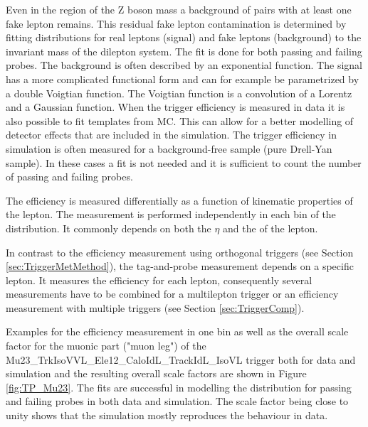 Even in the region of the Z boson mass a background of pairs with at least one fake lepton remains. This residual fake lepton contamination is determined by fitting distributions for real leptons (signal) and fake leptons (background) to the invariant mass of the dilepton system. The fit is done for both passing and failing probes. The background is often described by an exponential function. The signal has a more complicated functional form and can for example be parametrized by a double Voigtian function. The Voigtian function is a convolution of a Lorentz and a Gaussian function. When the trigger efficiency is measured in data it is also possible to fit templates from MC. This can allow for a better modelling of detector effects that are included in the simulation.
The trigger efficiency in simulation is often measured for a background-free sample (pure Drell-Yan sample). In these cases a fit is not needed and it is sufficient to count the number of passing and failing probes.

The efficiency is measured differentially as a function of kinematic properties of the lepton. The measurement is performed independently in each bin of the distribution.
It commonly depends on both the $\eta$ and the \pt of the lepton. 

In contrast to the efficiency measurement using orthogonal triggers (see Section \ref{sec:TriggerMetMethod}), the tag-and-probe measurement depends on a specific lepton. It measures the efficiency for each lepton, consequently several measurements have to be combined for a multilepton trigger or an efficiency measurement with multiple triggers (see Section \ref{sec:TriggerComp}). 

Examples for the efficiency measurement in one bin as well as the overall scale factor for the muonic part ("muon leg") of the Mu23\_TrkIsoVVL\_Ele12\_CaloIdL\_TrackIdL\_IsoVL trigger both for data and simulation and the resulting overall scale factors are shown in Figure \ref{fig:TP_Mu23}. The fits are successful in modelling the \mll \; distribution for passing and failing probes in both data and simulation. The scale factor being close to unity shows that the simulation mostly reproduces the behaviour in data.

